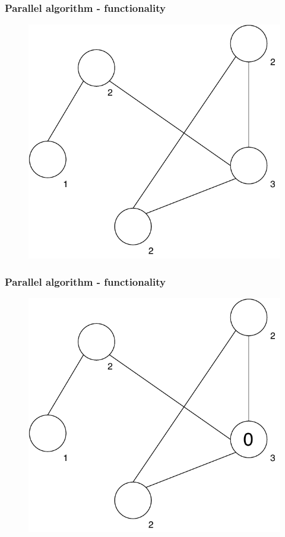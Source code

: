 \documentclass[11pt,xcolor=pdflatex]{beamer}
\begin{document}

\begin{frame}\frametitle{Parallel algorithm - functionality}

\begin{figure}
   \includegraphics[width=0.6\linewidth]{graph_level.pdf}
\end{figure}

\end{frame}


\begin{frame}\frametitle{Parallel algorithm - functionality}

\begin{figure}
   \includegraphics[width=0.6\linewidth]{graph_1colored.pdf}
\end{figure}

\end{frame}

\end{document}

